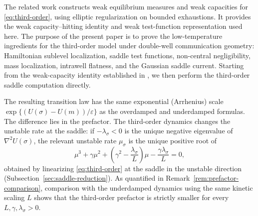 \documentclass[11pt]{article}
\numberwithin{equation}{section}
\theoremstyle{plain}
\theoremstyle{definition}
\theoremstyle{remark}
\newcommand{\eps}{\varepsilon}
\begin{document}
The related work \cite{HeLiWangZhu2026WeakEquilibrium} constructs weak
equilibrium measures and weak capacities for \eqref{eq:third-order}, using
elliptic regularization on bounded exhaustions.  It provides the weak
capacity--hitting identity and weak test-function representation used here.
The purpose of the present paper is to prove the low-temperature ingredients
for the third-order model under double-well communication geometry:
Hamiltonian sublevel localization, saddle test functions, non-central
negligibility, mass localization, intrawell flatness, and the Gaussian saddle
current.  Starting from the weak-capacity identity established in
\cite{HeLiWangZhu2026WeakEquilibrium}, we then perform the third-order saddle
computation directly.

The resulting transition law has the same exponential (Arrhenius) scale
$\exp\{(U(\sigma)-U(m))/\eps\}$ as the overdamped and underdamped formulas.
The difference lies in the prefactor.  The third-order dynamics changes the
unstable rate at the saddle: if $-\lambda_\sigma<0$ is the unique negative
eigenvalue of $\nabla^2U(\sigma)$, the relevant unstable rate $\mu_\sigma$ is
the unique positive root of
\begin{equation}
\label{eq:cubic-intro}
\mu^3+\gamma\mu^2+\left(\gamma^2-\frac{\lambda_\sigma}{L}\right)\mu
-\frac{\gamma\lambda_\sigma}{L}=0,
\end{equation}
obtained by linearizing \eqref{eq:third-order} at the saddle in the unstable
direction (Subsection~\ref{sec:saddle-reduction}).
As quantified in Remark~\ref{rem:prefactor-comparison}, comparison with the
underdamped dynamics using the same kinetic scaling $L$ shows that the
third-order prefactor is strictly smaller for every
$L,\gamma,\lambda_\sigma>0$.
\end{document}
